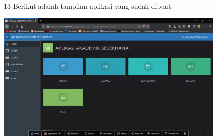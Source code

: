 \begin{enumerate}
\begin{figure}[!htbp]
\item[13] Berikut adalah tampilan aplikasi yang sudah dibuat.
\begin{center}
    \includegraphics[scale=0.3]{figures/Screenshot(63).png}
    \end{center}
    \end{figure}    
\end{enumerate}


